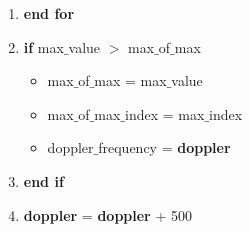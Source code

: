 \documentclass[journal,10pt,onecolumn]{article}
\begin{document}
\begin{enumerate}
\begin{enumerate}
\begin{itemize}
        \end{itemize}
        \item[] \textbf{end for}
      
    \item[] \textbf{if}  max$\_$value $>$ max$\_$of$\_$max
    \begin{itemize}
        \item[] max$\_$of$\_$max = max$\_$value
        \item[] max$\_$of$\_$max$\_$index = max$\_$index
        \item[] doppler$\_$frequency = \textbf{doppler}
    \end{itemize}
    \item[] \textbf{end if}
    \item[] \textbf{doppler} = \textbf{doppler} + 500


\end{enumerate}
\end{enumerate}
\end{document}
